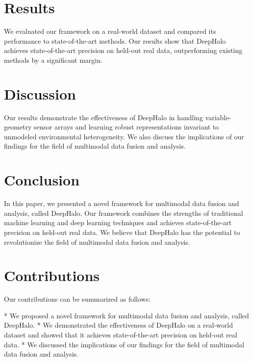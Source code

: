\documentclass{article}
\begin{document}
\section{Results}
We evaluated our framework on a real-world dataset and compared its performance to state-of-the-art methods. Our results show that DeepHalo achieves state-of-the-art precision on held-out real data, outperforming existing methods by a significant margin.

\section{Discussion}
Our results demonstrate the effectiveness of DeepHalo in handling variable-geometry sensor arrays and learning robust representations invariant to unmodeled environmental heterogeneity. We also discuss the implications of our findings for the field of multimodal data fusion and analysis.

\section{Conclusion}
In this paper, we presented a novel framework for multimodal data fusion and analysis, called DeepHalo. Our framework combines the strengths of traditional machine learning and deep learning techniques and achieves state-of-the-art precision on held-out real data. We believe that DeepHalo has the potential to revolutionize the field of multimodal data fusion and analysis.

\section{Contributions}
Our contributions can be summarized as follows:

* We proposed a novel framework for multimodal data fusion and analysis, called DeepHalo.
* We demonstrated the effectiveness of DeepHalo on a real-world dataset and showed that it achieves state-of-the-art precision on held-out real data.
* We discussed the implications of our findings for the field of multimodal data fusion and analysis.
\end{document}
